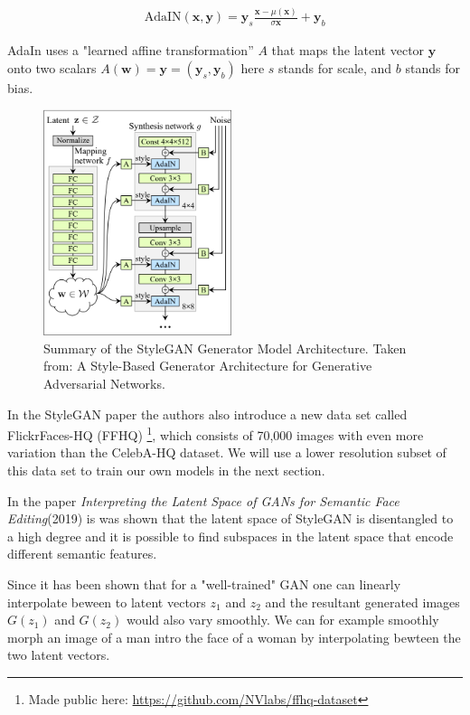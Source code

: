 \begin{align}
  \text{AdaIN}(\mathbf{x},\mathbf{y}) = \mathbf{y}_s \frac{\mathbf{x}-\mu(\mathbf{x})}{\sigma{\mathbf{x}}}+\mathbf{y}_b
\end{align}

AdaIn uses a "learned affine transformation” $A$ that maps the latent  vector $\mathbf{y}$ onto two scalars $A(\mathbf{w})= \mathbf{y}=(\mathbf{y}_s,\mathbf{y}_b)$ here $s$ stands for scale, and $b$ stands for bias.

\begin{figure}
\includegraphics[width=5.5cm]{fig/stylegan-arch}
\caption{Summary of the StyleGAN Generator Model Architecture.
Taken from: A Style-Based Generator Architecture for Generative Adversarial Networks.\cite{stylegan}}
\label{stylegan-arch}
\end{figure}


In the StyleGAN paper the authors also introduce a new data set called FlickrFaces-HQ (FFHQ) \footnote{Made public here: \url{https://github.com/NVlabs/ffhq-dataset}}, which consists of 70,000 images with even more variation than the CelebA-HQ dataset.\cite{stylegan} We will use a lower resolution subset of this data set to train our own models in the next section.

In the paper \textit{Interpreting the Latent Space of GANs for Semantic Face Editing}(2019)\cite{interfacegan} is was shown that the latent space of StyleGAN is disentangled to a high degree and it is possible to find subspaces in the latent space that encode different semantic features.

Since it has been shown that for a "well-trained" GAN one can linearly interpolate beween to latent vectors  $z_1$ and $z_2$ and the resultant generated images $G(z_1)$ and $G(z_2)$ would also vary smoothly. We can for example smoothly morph an image of a man intro the face of a woman by interpolating bewteen the two latent vectors.

